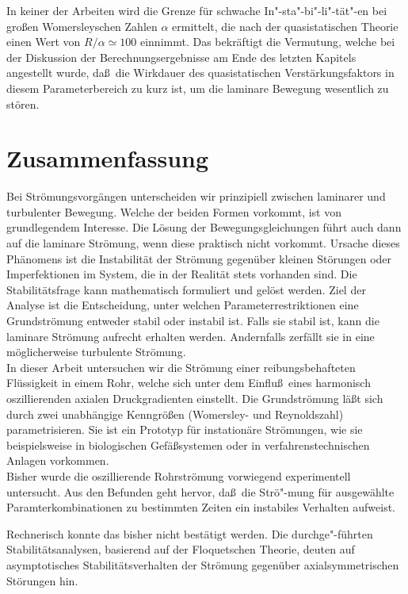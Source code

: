 \documentclass[10pt,a5paper,oneside,draft]{book}
\numberwithin{equation}{chapter}
\begin{document}
In keiner der Arbeiten wird die Grenze f\"ur schwache In"-sta"-bi"-li"-t\"at"-en bei gro\ss en Womersleyschen Zahlen $\alpha$ ermittelt, die nach der quasistatischen Theorie einen Wert von $R/\alpha \simeq 100$ einnimmt.
Das bekr\"aftigt die Vermutung, welche bei der Diskussion der Berechnungsergebnisse am Ende des letzten Kapitels angestellt wurde, da\ss\ die Wirkdauer des quasistatischen Verst\"arkungsfaktors in diesem Parameterbereich zu kurz ist, um die laminare Bewegung wesentlich zu st\"oren.

\chapter*{Zusammenfassung}\label{sec:zusammenfassung}
\pagestyle{epilogue}

Bei Str\"omungsvorg\"angen unterscheiden wir prinzipiell zwischen laminarer und turbulenter Bewegung.
Welche der beiden Formen vorkommt, ist von grundlegendem Interesse.
Die L\"osung der Bewegungsgleichungen f\"uhrt auch dann auf die laminare Str\"omung, wenn diese praktisch nicht vorkommt.
Ursache dieses Ph\"anomens ist die Instabilit\"at der Str\"omung gegen\"uber kleinen St\"orungen oder Imperfektionen im System, die in der Realit\"at stets vorhanden sind.
Die Stabilit\"atsfrage kann mathematisch formuliert und gel\"ost werden.
Ziel der Analyse ist die Entscheidung, unter welchen Parameterrestriktionen eine Grundstr\"omung entweder stabil oder instabil ist.
Falls sie stabil ist, kann die laminare Str\"omung aufrecht erhalten werden.
Andernfalls zerf\"allt sie in eine m\"oglicherweise turbulente Str\"omung.\\

In dieser Arbeit untersuchen wir die Str\"omung einer reibungsbehafteten Fl\"ussigkeit in einem Rohr, welche sich unter dem Einflu\ss\ eines harmonisch oszillierenden axialen Druckgradienten einstellt.
Die Grundstr\"omung l\"a\ss t sich durch zwei unabh\"angige Kenngr\"o\ss en (Womersley- und Reynoldszahl) parametrisieren.
Sie ist ein Prototyp f\"ur instation\"are Str\"omungen, wie sie beispielsweise in biologischen Gef\"a\ss systemen oder in verfahrenstechnischen Anlagen vorkommen.\\

Bisher wurde die oszillierende Rohrstr\"omung vorwiegend experimentell untersucht.
Aus den Befunden geht hervor, da\ss\ die Str\"o"-mung f\"ur ausgew\"ahlte Paramterkombinationen zu bestimmten Zeiten ein instabiles Verhalten aufweist.

Rechnerisch konnte das bisher nicht best\"atigt werden.
Die durchge"-f\"uhrten Stabilit\"atsanalysen, basierend auf der Floquetschen Theorie, deuten auf asymptotisches Stabilit\"atsverhalten der Str\"omung gegen\"uber axialsymmetrischen St\"orungen hin.\\
\end{document}
